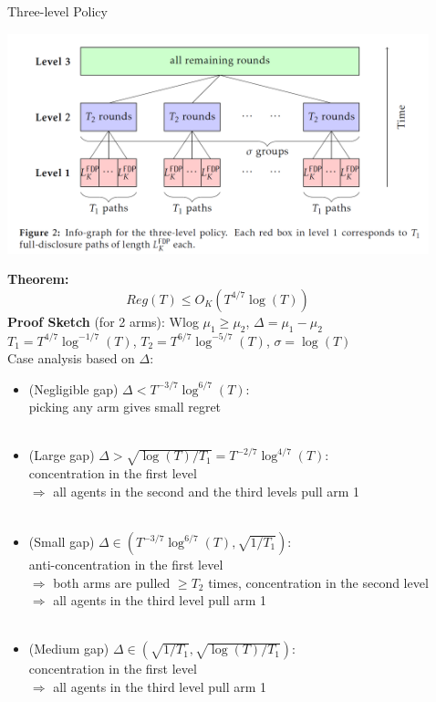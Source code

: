 \documentclass[final]{beamer}
\begin{document}
\begin{frame}[t]
\begin{columns}[t]
\begin{column}{.44\textwidth}
\end{column} %

\begin{column}{.01\textwidth}\end{column} %

\begin{column}{.44\textwidth} %
\begin{block}{Three-level Policy}

\begin{center}
\includegraphics[width=0.99\linewidth]{3l.png} 
\end{center}
\textbf{Theorem:}
\[
Reg(T) \leq O_K (T^{4/7} \log(T))
\]
\textbf{Proof Sketch} (for 2 arms): Wlog $\mu_1 \geq \mu_2$,  $\Delta = \mu_1 - \mu_2$\\
$T_1 = T^{4/7} \log^{-1/7}(T)$, $T_2 = T^{6/7}\log^{-5/7}(T)$, $\sigma= \log(T)$\\
Case analysis based on $\Delta$:
\begin{itemize}
\item (Negligible gap) $\Delta < T^{-3/7}\log^{6/7}(T)$: \\picking any arm gives small regret\\
~
\item (Large gap) $\Delta > \sqrt{\log(T)/T_1} = T^{-2/7} \log^{4/7}(T)$:\\ concentration in the first level \\$\Rightarrow$ all agents in the second and the third levels pull arm 1\\~
\item (Small gap) $\Delta \in (T^{-3/7}\log^{6/7}(T), \sqrt{1/T_1})$:\\ anti-concentration in the first level \\$\Rightarrow$ both arms are pulled $\geq T_2$ times, concentration in the second level\\ $\Rightarrow$ all agents in the third level pull arm 1\\~
\item (Medium gap) $\Delta \in (\sqrt{1/T_1}, \sqrt{\log(T)/T_1})$:\\ concentration in the first level \\$\Rightarrow$ all agents in the third level pull arm 1
\end{itemize}
\end{block}


\end{column}
\end{columns}
\end{frame}
\end{document}
